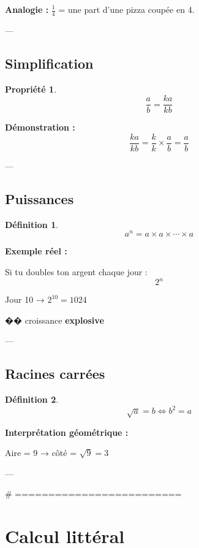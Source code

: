 \documentclass[11pt,a4paper]{article}
\newtheorem{definition}{Définition}
\newtheorem{property}{Propriété}
\begin{document}
\textbf{Analogie :}  
$\frac{1}{4}$ = une part d’une pizza coupée en 4.

---

\subsection{Simplification}

\begin{property}
\[
\frac{a}{b} = \frac{ka}{kb}
\]
\end{property}

\textbf{Démonstration :}
\[
\frac{ka}{kb} = \frac{k}{k} \times \frac{a}{b} = \frac{a}{b}
\]

---

\subsection{Puissances}

\begin{definition}
\[
a^n = a \times a \times \cdots \times a
\]
\end{definition}

\textbf{Exemple réel :}

Si tu doubles ton argent chaque jour :
\[
2^n
\]

Jour 10 → $2^{10} = 1024$

�� croissance \textbf{explosive}

---

\subsection{Racines carrées}

\begin{definition}
\[
\sqrt{a} = b \Leftrightarrow b^2 = a
\]
\end{definition}

\textbf{Interprétation géométrique :}

\begin{center}
\end{center}

Aire = 9 → côté = $\sqrt{9} = 3$

---

# =========================
\section{Calcul littéral}
\end{document}
